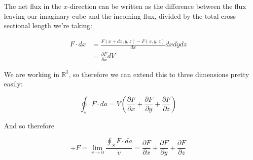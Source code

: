 \documentclass[10pt]{article}
\begin{document}
    \begin{solution}
        The net flux in the $x$-direction can be written as the difference between the flux leaving our imaginary cube and the incoming flux, divided by the total cross sectional length we're taking: 

        \begin{align*}
            F \cdot dx &= \frac{F(x + dx, y, z) - F(x, y, z)}{dx} dx dy dz\\
            &= \frac{\partial F}{\partial x} dV
        \end{align*}

        We are working in $\mathbb R^3$, so therefore we can extend this to three dimensions pretty easily: 

        \[ \oint_s F \cdot da = V\left(\frac{\partial F}{\partial x} + \frac{\partial F}{\partial y} + \frac{\partial F}{\partial z}\right)\] 

        And so therefore

        \[ \div F = \lim_{v \to 0} \frac{\oint_S F \cdot da}{v} = \frac{\partial F}{\partial x} + \frac{\partial F}{\partial y} + \frac{\partial F}{\partial z}\] 
    \end{solution}
\end{document}
